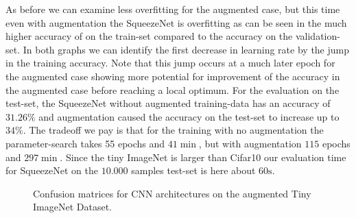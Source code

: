 \documentclass[11pt]{article}
\begin{document}
As before we can examine less overfitting for the augmented case, but this time even with augmentation the SqueezeNet is overfitting as can be seen in the much higher accuracy of on the train-set compared to the accuracy on the validation-set. In both graphs we can identify the first decrease in learning rate by the jump in the training accuracy. Note that this jump occurs at a much later epoch for the augmented case showing more potential for improvement of the accuracy in the augmented case before reaching a local optimum. For the evaluation on the test-set, the SqueezeNet without augmented training-data has an accuracy of $31.26\%$ and augmentation caused the accuracy on the test-set to increase up to $34\%$. The tradeoff we pay is that for the training with no augmentation the parameter-search takes 55 epochs and $41 \min$, but with augmentation $115$ epochs and $297 \min$. Since the tiny ImageNet is larger than Cifar10 our evaluation time for SqueezeNet on the $10.000$ samples test-set is here about $60\text{s}$.

\begin{figure}
\centering
{}
\hfill
{}
\hfill
\caption{Confusion matrices for CNN architectures on the augmented Tiny ImageNet Dataset.}
\label{rescnn::6}
\end{figure}
\end{document}
